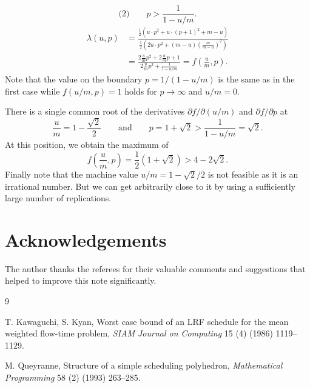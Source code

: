 \documentclass[11pt]{article}
\begin{document}
\[
\text{(2)}\qquad p>\frac1{1-u/m}.
\]
\[
\begin{aligned}
        \lambda(u,p)
        &=
        \frac{\frac12(u\cdot p^2+u\cdot(p+1)^2+m-u)}
        {\frac12\left(2u\cdot p^2
        +(m-u)\left(\frac{m}{m-u}\right)^2\right)}                 \\
        &=
        \frac{2\frac{u}{m}p^2+2\frac{u}{m}p+1}
        {2\frac{u}{m}p^2+\frac1{1-u/m}}
        =
        f\left(\frac{u}{m},p\right).
\end{aligned}
\]
Note that the value on the boundary $p=1/(1-u/m)$ is the same as in the
first case while $f(u/m,p)=1$ holds for $p\to\infty$ and $u/m=0$.

There is a single common root of the derivatives
$\partial f/\partial(u/m)$ and $\partial f/\partial p$ at
\[
        \frac{u}{m}=1-\frac{\sqrt{2}}2
        \qquad\text{and}\qquad
        p=1+\sqrt{2}
        >
        \frac1{1-u/m}
        =
        \sqrt{2}.
\]
At this position, we obtain the maximum of
\[
        f\left(\frac{u}{m},p\right)
        =
        \frac12(1+\sqrt{2})
        >
        4-2\sqrt{2}.
\]
Finally note that the machine value $u/m=1-\sqrt{2}/2$ is not feasible as it
is an irrational number. But we can get arbitrarily close to it by using a
sufficiently large number of replications.

\section*{Acknowledgements}

The author thanks the referees for their valuable comments and suggestions
that helped to improve this note significantly.

\begin{thebibliography}{9}

T. Kawaguchi, S. Kyan,
Worst case bound of an LRF schedule for the mean weighted flow-time problem,
\emph{SIAM Journal on Computing} 15 (4) (1986) 1119--1129.

M. Queyranne,
Structure of a simple scheduling polyhedron,
\emph{Mathematical Programming} 58 (2) (1993) 263--285.

\end{thebibliography}
\end{document}
